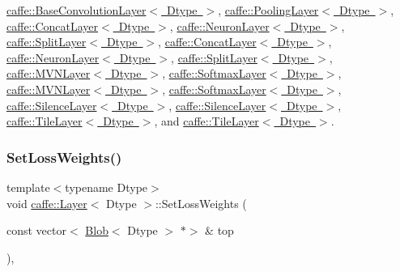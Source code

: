 \mbox{\hyperlink{classcaffe_1_1_base_convolution_layer_af384650d31552ea10b1a030788cb52d8}{caffe\+::\+Base\+Convolution\+Layer$<$ Dtype $>$}}, \mbox{\hyperlink{classcaffe_1_1_pooling_layer_ad8ab4e6541bc0954146d62781aeb1af8}{caffe\+::\+Pooling\+Layer$<$ Dtype $>$}}, \mbox{\hyperlink{classcaffe_1_1_concat_layer_a3c7cbd500d3a15cfbdbf33479c4fb228}{caffe\+::\+Concat\+Layer$<$ Dtype $>$}}, \mbox{\hyperlink{classcaffe_1_1_neuron_layer_a6d0facf4a5e6f459cf1cb8b28d945790}{caffe\+::\+Neuron\+Layer$<$ Dtype $>$}}, \mbox{\hyperlink{classcaffe_1_1_split_layer_a4e978965461dedcc2fbb905e4910c0b1}{caffe\+::\+Split\+Layer$<$ Dtype $>$}}, \mbox{\hyperlink{classcaffe_1_1_concat_layer_af210770b1c8bbce8fc34340ba94f9f75}{caffe\+::\+Concat\+Layer$<$ Dtype $>$}}, \mbox{\hyperlink{classcaffe_1_1_neuron_layer_a2c87bff832b685db76a41cbc8539e7ce}{caffe\+::\+Neuron\+Layer$<$ Dtype $>$}}, \mbox{\hyperlink{classcaffe_1_1_split_layer_a1064977331e5bfcf5d75590d14986e1f}{caffe\+::\+Split\+Layer$<$ Dtype $>$}}, \mbox{\hyperlink{classcaffe_1_1_m_v_n_layer_a48aafabe729bb3b22171cfdbda6e6073}{caffe\+::\+M\+V\+N\+Layer$<$ Dtype $>$}}, \mbox{\hyperlink{classcaffe_1_1_softmax_layer_a756fd5ad3af07d019b5f2247f38b4496}{caffe\+::\+Softmax\+Layer$<$ Dtype $>$}}, \mbox{\hyperlink{classcaffe_1_1_m_v_n_layer_afcb6c5f28b45496eed1b0ea19705b763}{caffe\+::\+M\+V\+N\+Layer$<$ Dtype $>$}}, \mbox{\hyperlink{classcaffe_1_1_softmax_layer_a503694b3161839de7c19d7d0af2cecc2}{caffe\+::\+Softmax\+Layer$<$ Dtype $>$}}, \mbox{\hyperlink{classcaffe_1_1_silence_layer_a96a47a49a103e60a681f97eff7bf42f2}{caffe\+::\+Silence\+Layer$<$ Dtype $>$}}, \mbox{\hyperlink{classcaffe_1_1_silence_layer_a96a47a49a103e60a681f97eff7bf42f2}{caffe\+::\+Silence\+Layer$<$ Dtype $>$}}, \mbox{\hyperlink{classcaffe_1_1_tile_layer_a593f5b8342f1b092633d2a1f7e4a6843}{caffe\+::\+Tile\+Layer$<$ Dtype $>$}}, and \mbox{\hyperlink{classcaffe_1_1_tile_layer_a1fe845a1597dbc119e922ee92032632b}{caffe\+::\+Tile\+Layer$<$ Dtype $>$}}.

\mbox{\label{classcaffe_1_1_layer_a04eb2a3d1d59c64cd64c233217d5d6fc}} 
\subsubsection{\texorpdfstring{Set\+Loss\+Weights()}{SetLossWeights()}\hspace{0.1cm}{\footnotesize\ttfamily [1/2]}}
{\footnotesize\ttfamily template$<$typename Dtype$>$ \\
void \mbox{\hyperlink{classcaffe_1_1_layer}{caffe\+::\+Layer}}$<$ Dtype $>$\+::Set\+Loss\+Weights (\begin{DoxyParamCaption}\item[{const vector$<$ \mbox{\hyperlink{classcaffe_1_1_blob}{Blob}}$<$ Dtype $>$ $\ast$$>$ \&}]{top }\end{DoxyParamCaption})\hspace{0.3cm}{\ttfamily [inline]}, {\ttfamily [protected]}}

